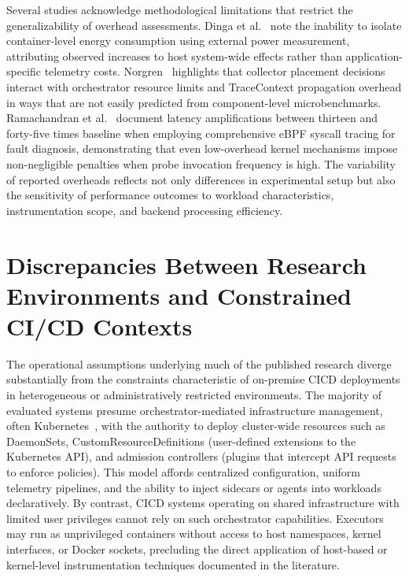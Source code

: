 Several studies acknowledge methodological limitations that restrict the generalizability of overhead assessments. Dinga et al.~\cite{dingaEmpiricalEvaluationEnergy2023} note the inability to isolate container-level energy consumption using external power measurement, attributing observed increases to host system-wide effects rather than application-specific telemetry costs. Norgren~\cite{norgrenOPTIMIZINGDISTRIBUTEDTRACING} highlights that collector placement decisions interact with orchestrator resource limits and TraceContext propagation overhead in ways that are not easily predicted from component-level microbenchmarks. Ramachandran et al.~\cite{ramachandranFUSEFaultDiagnosis2023} document latency amplifications between thirteen and forty-five times baseline when employing comprehensive \gls{eBPF} syscall tracing for fault diagnosis, demonstrating that even low-overhead kernel mechanisms impose non-negligible penalties when probe invocation frequency is high. The variability of reported overheads reflects not only differences in experimental setup but also the sensitivity of performance outcomes to workload characteristics, instrumentation scope, and backend processing efficiency.


\section{Discrepancies Between Research Environments and Constrained CI/CD Contexts}
\label{sec:environment-mismatch}

The operational assumptions underlying much of the published research diverge substantially from the constraints characteristic of on-premise \ac{CICD} deployments in heterogeneous or administratively restricted environments. The majority of evaluated systems presume orchestrator-mediated infrastructure management, often Kubernetes~\cite{kubernetes2015}, with the authority to deploy cluster-wide resources such as DaemonSets, CustomResourceDefinitions (user-defined extensions to the Kubernetes API), and admission controllers (plugins that intercept API requests to enforce policies). This model affords centralized configuration, uniform telemetry pipelines, and the ability to inject sidecars or agents into workloads declaratively. By contrast, \ac{CICD} systems operating on shared infrastructure with limited user privileges cannot rely on such orchestrator capabilities. Executors may run as unprivileged containers without access to host namespaces, kernel interfaces, or Docker sockets, precluding the direct application of host-based or kernel-level instrumentation techniques documented in the literature.

